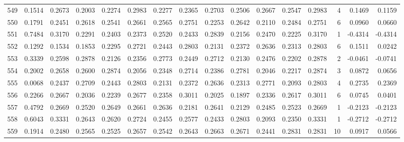 \begin{tabular}{lrrrrrrrrrrrrrrr}
549 &      0.1514 &  0.2673 &  0.2003 &  0.2274 &  0.2983 &  0.2277 &  0.2365 &  0.2703 &  0.2506 &  0.2667 &   0.2547 &     0.2983 &      4 &                    0.1469 &                     0.1159 \\
550 &      0.1791 &  0.2451 &  0.2618 &  0.2541 &  0.2661 &  0.2565 &  0.2751 &  0.2253 &  0.2642 &  0.2110 &   0.2484 &     0.2751 &      6 &                    0.0960 &                     0.0660 \\
551 &      0.7484 &  0.3170 &  0.2291 &  0.2403 &  0.2373 &  0.2520 &  0.2433 &  0.2839 &  0.2156 &  0.2470 &   0.2225 &     0.3170 &      1 &                   -0.4314 &                    -0.4314 \\
552 &      0.1292 &  0.1534 &  0.1853 &  0.2295 &  0.2721 &  0.2443 &  0.2803 &  0.2131 &  0.2372 &  0.2636 &   0.2313 &     0.2803 &      6 &                    0.1511 &                     0.0242 \\
553 &      0.3339 &  0.2598 &  0.2878 &  0.2126 &  0.2356 &  0.2773 &  0.2449 &  0.2712 &  0.2130 &  0.2476 &   0.2202 &     0.2878 &      2 &                   -0.0461 &                    -0.0741 \\
554 &      0.2002 &  0.2658 &  0.2600 &  0.2874 &  0.2056 &  0.2348 &  0.2714 &  0.2386 &  0.2781 &  0.2046 &   0.2217 &     0.2874 &      3 &                    0.0872 &                     0.0656 \\
555 &      0.0068 &  0.2437 &  0.2709 &  0.2443 &  0.2803 &  0.2131 &  0.2372 &  0.2636 &  0.2313 &  0.2771 &   0.2093 &     0.2803 &      4 &                    0.2735 &                     0.2369 \\
556 &      0.2266 &  0.2667 &  0.2036 &  0.2239 &  0.2677 &  0.2358 &  0.3011 &  0.2025 &  0.1897 &  0.2336 &   0.2617 &     0.3011 &      6 &                    0.0745 &                     0.0401 \\
557 &      0.4792 &  0.2669 &  0.2520 &  0.2649 &  0.2661 &  0.2636 &  0.2181 &  0.2641 &  0.2129 &  0.2485 &   0.2523 &     0.2669 &      1 &                   -0.2123 &                    -0.2123 \\
558 &      0.6043 &  0.3331 &  0.2643 &  0.2620 &  0.2724 &  0.2455 &  0.2577 &  0.2433 &  0.2803 &  0.2093 &   0.2350 &     0.3331 &      1 &                   -0.2712 &                    -0.2712 \\
559 &      0.1914 &  0.2480 &  0.2565 &  0.2525 &  0.2657 &  0.2542 &  0.2643 &  0.2663 &  0.2671 &  0.2441 &   0.2831 &     0.2831 &     10 &                    0.0917 &                     0.0566 \\

\end{tabular}
